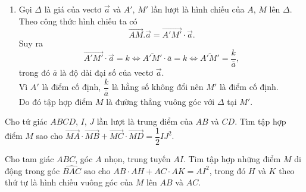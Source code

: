 \begin{bt}
{\begin{enumerate}
\begin{itemize}
			      \end{itemize}
			\item   Gọi $\Delta $ là giá của vectơ $\overrightarrow{a}$ và $A'$, $M'$ lần lượt là hình chiếu của $A$, $M$ lên $\Delta $.
			      Theo công thức hình chiếu ta có $$\overrightarrow{AM}.\overrightarrow{a}=\overrightarrow{A'M'}\cdot \overrightarrow{a}.$$
			      Suy ra $$\overrightarrow{A'M'}\cdot \overrightarrow{a}=k\Leftrightarrow \overline{A'M'}\cdot \overline{a}=k\Leftrightarrow \overline{A'M'}=\dfrac{k}{\overline{a}},$$ trong đó $\overline{a}$ là độ dài đại số của vectơ $\overrightarrow{a}$.\\
			      Vì $A'$ là điểm cố định, $\dfrac{k}{\overline{a}}$ là hằng số không đổi nên $M'$ là điểm cố định.\\
			      Do đó tập hợp điểm $M$ là đường thẳng vuông góc với $\Delta $ tại $M'$.

		\end{enumerate}
	}
\end{bt}
\begin{bt}%
	Cho tứ giác $ABCD$, $I$, $J$ lần lượt là trung điểm của $AB$ và $CD$. Tìm tập hợp điểm $M$ sao cho $\overrightarrow{MA}\cdot \overrightarrow{MB}+\overrightarrow{MC}\cdot \overrightarrow{MD}=\dfrac{1}{2}IJ^2$.
\end{bt}
\begin{bt}%
	Cho tam giác $ABC$, góc $A$ nhọn, trung tuyến $AI$. Tìm tập hợp những điểm $M$ di động trong góc $\widehat{BAC}$ sao cho $AB\cdot AH+AC\cdot AK=AI^2$, trong đó $H$ và $K$ theo thứ tự là hình chiếu vuông góc của $M$ lên $AB$ và $AC$.
\end{bt}
